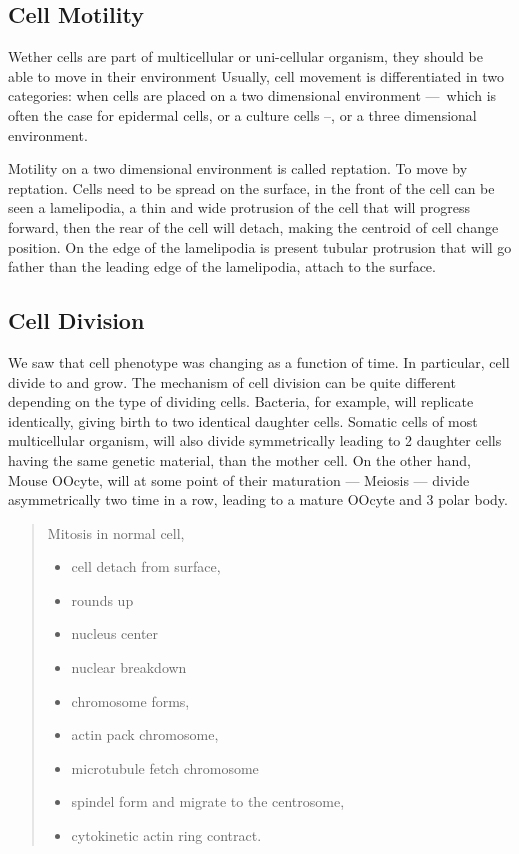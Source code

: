 \documentclass[A4paperpaper,11pt,english]{sphinxmanual}
\begin{document}
\subsection{Cell Motility}
\label{parts/part1:cell-motility}
Wether cells are part of multicellular or uni-cellular organism, they should
be able to move in their environment Usually, cell movement is differentiated
in two categories: when cells are placed on a two dimensional environment
— which is often the case for epidermal cells, or a culture cells –, or a three
dimensional environment.

Motility on a  two dimensional environment is called reptation. To move by
reptation. Cells need to be spread on the surface, in the front of the cell can
be seen a lamelipodia, a thin and wide protrusion of the cell that will
progress forward, then the rear of the cell will detach, making the centroid of
cell change position. On the edge of the lamelipodia is present tubular
protrusion that will go father than the leading edge of the lamelipodia, attach
to the surface.


\subsection{Cell Division}
\label{parts/part1:cell-division}
We saw that cell phenotype was changing as a function of time.  In
particular, cell divide to and grow. The mechanism of cell division can be
quite different depending on the type of dividing cells. Bacteria, for
example, will replicate identically, giving birth to two identical daughter
cells. Somatic cells of most multicellular organism, will also divide
symmetrically leading to 2 daughter cells having the same genetic material,
than the mother cell.  On the other hand, Mouse OOcyte, will at some point
of their maturation — Meiosis — divide asymmetrically two time in a row,
leading to a mature OOcyte and 3 polar body.
\begin{quote}

Mitosis in normal cell,
\begin{itemize}
\item {} 
cell detach from surface,

\item {} 
rounds up

\item {} 
nucleus center

\item {} 
nuclear breakdown

\item {} 
chromosome forms,

\item {} 
actin pack chromosome,

\item {} 
microtubule fetch chromosome

\item {} 
spindel form and migrate to the centrosome,

\item {} 
cytokinetic actin ring contract.

\end{itemize}
\end{quote}
\end{document}
